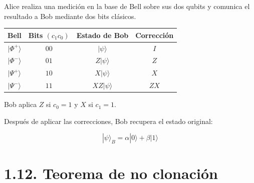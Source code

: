 \documentclass{afitdefense}
\begin{document}
\begin{Center}

\small
Alice realiza una medición en la base de Bell
sobre sus dos qubits y comunica el resultado
a Bob mediante dos bits clásicos.

\vspace{0.5cm}

\begin{center}
\scriptsize
\setlength{\tabcolsep}{5pt}
\renewcommand{\arraystretch}{1.3}

\begin{tabular}{c c c c}
\hline
\textbf{Bell} &
\textbf{Bits $(c_1c_0)$} &
\textbf{Estado de Bob} &
\textbf{Corrección} \\
\hline

$|\Phi^+\rangle$ & $00$ &
$|\psi\rangle$ & $I$ \\

$|\Phi^-\rangle$ & $01$ &
$Z|\psi\rangle$ & $Z$ \\

$|\Psi^+\rangle$ & $10$ &
$X|\psi\rangle$ & $X$ \\

$|\Psi^-\rangle$ & $11$ &
$XZ|\psi\rangle$ & $ZX$ \\

\hline
\end{tabular}
\end{center}

\vspace{0.5cm}

Bob aplica $Z$ si $c_0=1$
y $X$ si $c_1=1$.

\vspace{0.4cm}

Después de aplicar las correcciones,
Bob recupera el estado original:

\[
\boxed{
|\psi\rangle_B =
\alpha|0\rangle+\beta|1\rangle
}
\]

\end{Center}




\section{1.12. Teorema de no clonación}
\end{document}
